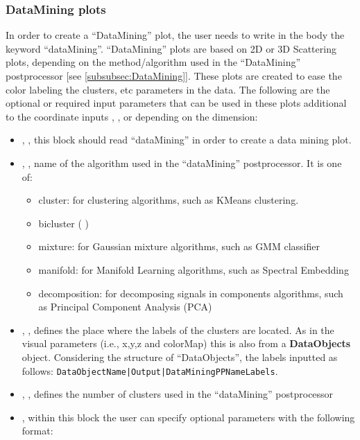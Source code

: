 \subsubsection{DataMining plots}
In order to create a ``DataMining'' plot, the user needs to write in the
 body the keyword ``dataMining''.
%
``DataMining'' plots are based on 2D or 3D Scattering plots, depending on the method/algorithm
used in the ``DataMining'' postprocessor [see  \ref{subsubsec:DataMining}]. These plots
are created to ease the color labeling the clusters, etc parameters in the data.
%
The following are the optional or required input parameters  that can be used in these plots
additional to the coordinate inputs ,  , or  depending
 on the dimension:
\begin{itemize}
  \item {}, , this block should read ``dataMining''
  in order to create a data mining plot.
  \item {}, , name of the algorithm used in the
  ``dataMining'' postprocessor. It is one of:
  \begin{itemize}
	\item cluster: for clustering algorithms, such as KMeans clustering.
	\item bicluster ( )
	\item mixture: for Gaussian mixture algorithms, such as GMM classifier
	\item manifold: for Manifold Learning algorithms, such as Spectral Embedding
	\item decomposition: for decomposing signals in components algorithms, such as Principal
        Component Analysis (PCA)
 \end{itemize}
 \item {}, , defines the place where
 the labels of the clusters are located. As in the visual parameters (i.e., x,y,z and
 colorMap) this is also from a \textbf{DataObjects} object. Considering the structure of
 ``DataObjects'', the labels inputted as follows: \texttt{DataObjectName|Output|DataMiningPPNameLabels}.
 \item {}, , defines the number of
 clusters used in the ``dataMining'' postprocessor 

 \item {}, within this block the user can specify optional
  parameters with the following format:


\end{itemize}
